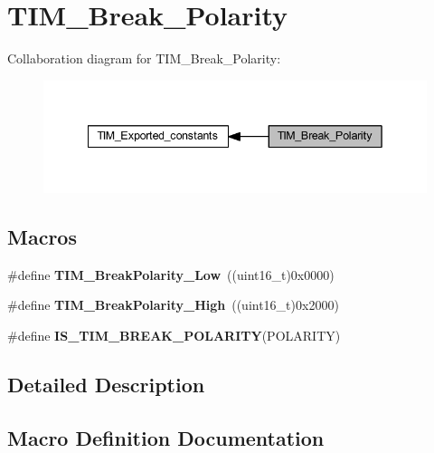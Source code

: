 \hypertarget{group___t_i_m___break___polarity}{}\section{T\+I\+M\+\_\+\+Break\+\_\+\+Polarity}
\label{group___t_i_m___break___polarity}
Collaboration diagram for T\+I\+M\+\_\+\+Break\+\_\+\+Polarity\+:\nopagebreak
\begin{figure}[H]
\begin{center}
\leavevmode
\includegraphics[width=342pt]{group___t_i_m___break___polarity}
\end{center}
\end{figure}
\subsection*{Macros}
\begin{DoxyCompactItemize}
\item 
\mbox{\label{group___t_i_m___break___polarity_ga565656ca81d17f9a1807afe3971dff6e}} 
\#define {\bfseries T\+I\+M\+\_\+\+Break\+Polarity\+\_\+\+Low}~((uint16\+\_\+t)0x0000)
\item 
\mbox{\label{group___t_i_m___break___polarity_gabd4b72079548fd8903413a348539542b}} 
\#define {\bfseries T\+I\+M\+\_\+\+Break\+Polarity\+\_\+\+High}~((uint16\+\_\+t)0x2000)
\item 
\#define {\bfseries I\+S\+\_\+\+T\+I\+M\+\_\+\+B\+R\+E\+A\+K\+\_\+\+P\+O\+L\+A\+R\+I\+TY}(P\+O\+L\+A\+R\+I\+TY)
\end{DoxyCompactItemize}


\subsection{Detailed Description}


\subsection{Macro Definition Documentation}
\mbox{\label{group___t_i_m___break___polarity_gaa29e33e74c5ff10972357ddd3f47f078}} 
